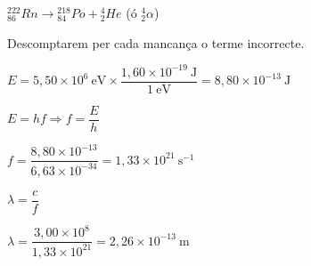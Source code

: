 \begin{solapartat}
 ${}^{222}_{86}\mathit{Rn} \rightarrow {}^{218}_{84}\mathit{Po} + {}^{4}_{2}\mathit{He}$ \quad (ó ${}^{4}_{2}\alpha$)

Descomptarem  per cada mancança o terme incorrecte.
\end{solapartat}

\begin{solapartat}
 $E = 5,50\times 10^{6}\ \mathrm{eV}\times\dfrac{1,60\times 10^{-19}\ \mathrm{J}}{1\ \mathrm{eV}} = 8,80\times 10^{-13}\ \mathrm{J}$

 $E = hf \Rightarrow f = \dfrac{E}{h}$

 $f = \dfrac{8,80\times 10^{-13}}{6,63\times 10^{-34}} = 1,33\times 10^{21}\ \mathrm{s^{-1}}$

 $\lambda = \dfrac{c}{f}$

 $\lambda = \dfrac{3,00\times 10^{8}}{1,33\times 10^{21}} = 2,26\times 10^{-13}\ \mathrm{m}$
\end{solapartat}
